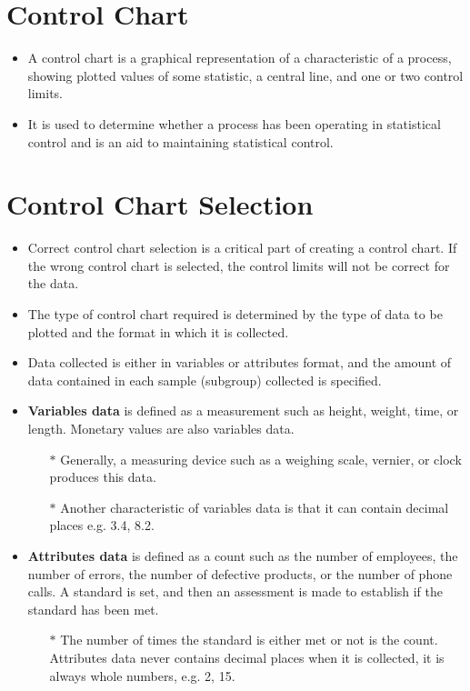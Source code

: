 \documentclass[a4paper,12pt]{article}
\begin{document}
\tableofcontents
\newpage


\section{Control Chart}
\begin{itemize}
\item A control chart is a graphical representation of a characteristic of a process, showing plotted values of some statistic, a central line, and one or two control limits. \item It is used to determine whether a process has been operating in statistical control and is an aid to maintaining statistical control.
\end{itemize}


\newpage
\section{Control Chart Selection}
\begin{itemize}
\item Correct control chart selection is a critical part of creating a control chart. If the wrong control chart is selected, the control limits will not be correct for the data. 
\item The type of control chart required is determined by the type of data to be plotted and the format in which it is collected. \item Data collected is either in variables or attributes format, and the amount of data contained in each sample (subgroup) collected is specified.

\item \textbf{Variables data} is defined as a measurement such as height, weight, time, or length. Monetary values are also variables data. 
\begin{itemize}
\item[$\ast$] Generally, a measuring device such as a weighing scale, vernier, or clock produces this data. \item[$\ast$] Another characteristic of variables data is that it can contain decimal places e.g. 3.4, 8.2.
\end{itemize}

\item \textbf{Attributes data} is defined as a count such as the number of employees, the number of errors, the number of defective products, or the number of phone calls. A standard is set, and then an assessment is made to establish if the standard has been met. 
\begin{itemize}
\item[$\ast$] The number of times the standard is either met or not is the count. Attributes data never contains decimal places when it is collected, it is always whole numbers, e.g. 2, 15.
\end{itemize}
\end{itemize}
\end{document}
